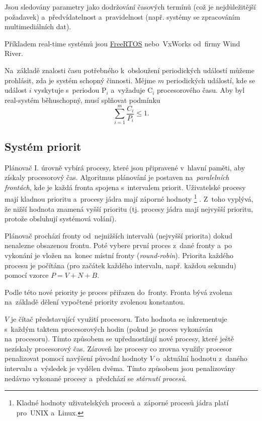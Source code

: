 Jsou sledovány parametry jako dodržování časových termínů (což je nejdůležitější požadavek) a~předvídatelnost a~pravidelnost (např. systémy se zpracováním multimediálních dat).

Příkladem real-time systémů jsou \href{https://github.com/FreeRTOS/FreeRTOS}{FreeRTOS} nebo~VxWorks od~firmy Wind River.

Na~základě znalosti času potřebného k~obsloužení periodických událostí můžeme prohlásit, zda je systém schopný činnosti. Mějme $m$ periodických událostí, kde se událost $i$ vyskytuje s~periodou $\mathrm{P}_i$ a~vyžaduje $\mathrm{C}_i$ procesorového času. Aby byl real-systém běhuschopný, musí splňovat podmínku
$$\sum\limits_{i=1}^m \frac{C_i}{P_i} \leq 1.$$

\subsection{Systém priorit}

Plánovač I. úrovně vybírá procesy, které jsou připravené v~hlavní paměti, aby získaly procesorový čas. Algoritmus plánování je postaven na~\emph{paralelních frontách}, kde je každá fronta spojena s~intervalem priorit. Uživatelské procesy mají kladnou prioritu a~procesy jádra mají záporné hodnoty%
\footnote{Kladné hodnoty uživatelských procesů a~záporné procesů jádra platí pro~UNIX a~Linux.}%
. Z~toho vyplývá, že nižší hodnota znamená vyšší prioritu (tj. procesy jádra mají nejvyšší prioritu, protože obsluhují systémová volání).

Plánovač prochází fronty od~nejnižších intervalů (nejvyšší priorita) dokud nenalezne obsazenou frontu. Poté vybere první proces z~dané fronty a~po vykonání je vložen na~konec místní fronty (\emph{round-robin}). Priorita každého procesu je počítána (pro začátek každého intervalu, např. každou sekundu) pomocí vzorce $P = V + N + B$.

Podle této nové priority je proces přiřazen do~fronty. Fronta bývá zvolena na~základě dělení vypočtené priority zvolenou konstantou. 

$V$ je čítač představující využití procesoru. Tato hodnota se inkrementuje s~každým taktem procesorových hodin (pokud je proces vykonáván na~procesoru). Tímto způsobem se upřednostňují nové procesy, které ještě nezískaly procesorový čas. Zároveň lze procesy co zrovna využily procesor penalizovat pomocí navýšení původní hodnoty $V$ o~aktuální hodnotu z~daného intervalu a~výsledek je vydělen dvěma. Tímto způsobem jsou penalizovány nedávno vykonané procesy a~předchází se \emph{stárnutí procesů}.

